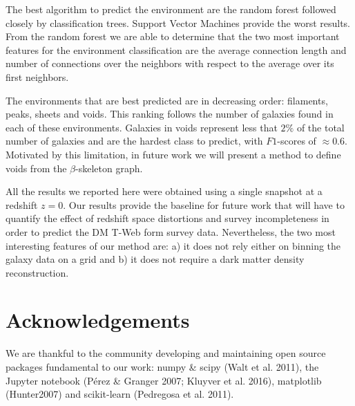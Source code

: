 \documentclass[usenatbib]{mnras}
\begin{document}
The best algorithm to predict the environment are the random forest followed closely by classification trees. 
Support Vector Machines provide the worst results.
From the random forest we are able to determine that the two most
important features for the environment classification are the average connection length and number of connections over the neighbors with respect to the average over its first neighbors.

The environments that are best predicted are in decreasing order: 
filaments, peaks, sheets and voids. 
This ranking follows the number of galaxies found in each of these environments.
Galaxies in voids represent less that $2\%$ of the total number of galaxies and 
are the hardest class to predict, with $F1$-scores of $\approx0.6$.
Motivated by this limitation, in future work we will present a method to define
voids from the $\beta$-skeleton graph.

All the results we reported here were obtained using a single snapshot at a 
redshift $z=0$.
Our results provide the baseline for future work that will have to quantify 
the effect of redshift space distortions and survey incompleteness in order to
predict  the DM T-Web form survey data.
Nevertheless, the two most interesting features of our method are: a) it does not
rely either on binning the galaxy data on a grid and b) it does not require a dark matter density reconstruction.



\section*{Acknowledgements}

We are thankful to the community developing and maintaining open source packages fundamental to our work: numpy
\&  scipy  (Walt  et  al.  2011),  the  Jupyter  notebook  (P\'erez \& Granger 2007; Kluyver et al. 2016), matplotlib (Hunter2007) and  scikit-learn (Pedregosa et al. 2011).






\bsp	%
\label{lastpage}
\end{document}
